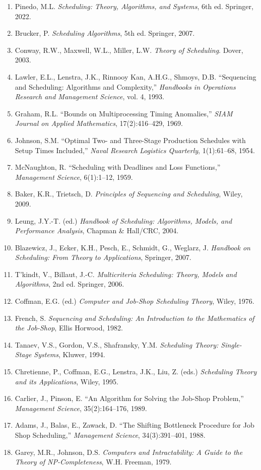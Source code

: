 \documentclass[a4paper, 11pt]{article}
\begin{document}
\begin{enumerate}
\item Pinedo, M.L. \textit{Scheduling: Theory, Algorithms, and Systems}, 6th ed. Springer, 2022.
\item Brucker, P. \textit{Scheduling Algorithms}, 5th ed. Springer, 2007.
\item Conway, R.W., Maxwell, W.L., Miller, L.W. \textit{Theory of Scheduling}. Dover, 2003.
\item Lawler, E.L., Lenstra, J.K., Rinnooy Kan, A.H.G., Shmoys, D.B. ``Sequencing and Scheduling:
Algorithms and Complexity,'' \textit{Handbooks in Operations Research and Management Science},
vol. 4, 1993.
\item Graham, R.L. ``Bounds on Multiprocessing Timing Anomalies,'' \textit{SIAM Journal on Applied
Mathematics}, 17(2):416--429, 1969.
\item Johnson, S.M. ``Optimal Two- and Three-Stage Production Schedules with Setup Times Included,''
\textit{Naval Research Logistics Quarterly}, 1(1):61--68, 1954.
\item McNaughton, R. ``Scheduling with Deadlines and Loss Functions,'' \textit{Management Science},
6(1):1--12, 1959.
\item Baker, K.R., Trietsch, D. \textit{Principles of Sequencing and Scheduling}, Wiley, 2009.
\item Leung, J.Y.-T. (ed.) \textit{Handbook of Scheduling: Algorithms, Models, and Performance
Analysis}, Chapman \& Hall/CRC, 2004.
\item Blazewicz, J., Ecker, K.H., Pesch, E., Schmidt, G., Weglarz, J. \textit{Handbook on
Scheduling: From Theory to Applications}, Springer, 2007.
\item T'kindt, V., Billaut, J.-C. \textit{Multicriteria Scheduling: Theory, Models and Algorithms},
2nd ed. Springer, 2006.
\item Coffman, E.G. (ed.) \textit{Computer and Job-Shop Scheduling Theory}, Wiley, 1976.
\item French, S. \textit{Sequencing and Scheduling: An Introduction to the Mathematics of the
Job-Shop}, Ellis Horwood, 1982.
\item Tanaev, V.S., Gordon, V.S., Shafransky, Y.M. \textit{Scheduling Theory: Single-Stage Systems},
Kluwer, 1994.
\item Chretienne, P., Coffman, E.G., Lenstra, J.K., Liu, Z. (eds.) \textit{Scheduling Theory and
its Applications}, Wiley, 1995.
\item Carlier, J., Pinson, E. ``An Algorithm for Solving the Job-Shop Problem,'' \textit{Management
Science}, 35(2):164--176, 1989.
\item Adams, J., Balas, E., Zawack, D. ``The Shifting Bottleneck Procedure for Job Shop Scheduling,''
\textit{Management Science}, 34(3):391--401, 1988.
\item Garey, M.R., Johnson, D.S. \textit{Computers and Intractability: A Guide to the Theory of
NP-Completeness}, W.H. Freeman, 1979.
\end{enumerate}
\end{document}
